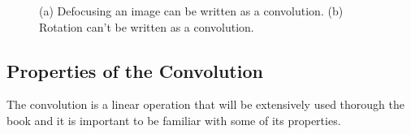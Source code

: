 \begin{figure}[h!]
	\centerline{
	}
	\caption{(a) Defocusing an image can be written as a convolution. (b) Rotation can't be written as a convolution.}
	\label{fig:transformationsquizz2}
\end{figure}





%
%
%
%



\subsection{Properties of the Convolution}\label{sec:linear_image_filtering:properties_of_the_convolution}

The convolution is a linear operation that will be extensively used thorough the book and it is important to be familiar with some of its properties.

